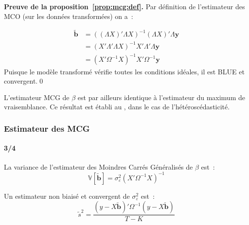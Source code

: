 \documentclass[10pt]{beamer}
\begin{document}
\begin{notes}

  \textbf{Preuve de la proposition~\ref{prop:mcg:def}.} Par définition de l'estimateur des MCO (sur les données transformées) on a~:

  \[
    \begin{split}
      \tilde{\mathbf b} &= \left( (\Lambda X)'\Lambda X\right)^{-1}(\Lambda X)'\Lambda \mathbf y\\
                         &= \left( X'\Lambda' \Lambda X \right)^{-1}X'\Lambda'\Lambda \mathbf y\\
                         &= \left( X'\Omega^{-1}X \right)^{-1}X'\Omega^{-1}\mathbf y
    \end{split}
  \]
  Puisque le modèle transformé vérifie toutes les conditions idéales, il est BLUE et convergent.\qed

  \bigskip

  L'estimateur MCG de $\beta$ est par ailleurs identique à l'estimateur du maximum de
  vraisemblance. Ce résultat est établi au , dans le cas de
  l'hétéroscédasticité.

\end{notes}


\begin{frame}
  \frametitle{Estimateur des MCG}
  \framesubtitle{3/4}


  \begin{prop}\label{prop:mcg:variance}
    La variance de l'estimateur des Moindres Carrés Généralisés de $\beta$ est~:
    \[
      \mathbb V \left[\tilde{\mathbf b}\right] = \sigma_{\varepsilon}^2(X'\Omega^{-1}X)^{-1}
    \]
  \end{prop}

  \bigskip

  \begin{prop}\label{prop:mcg:s2}
    Un estimateur non biaisé et convergent de $\sigma_{\varepsilon}^2$ est~:
    \[
      \tilde s^2 = \frac{\left(y-X\tilde{\mathbf b}\right)'\Omega^{-1}\left(y-X\tilde{\mathbf b}\right)}{T-K}
    \]
  \end{prop}

\end{frame}
\end{document}
